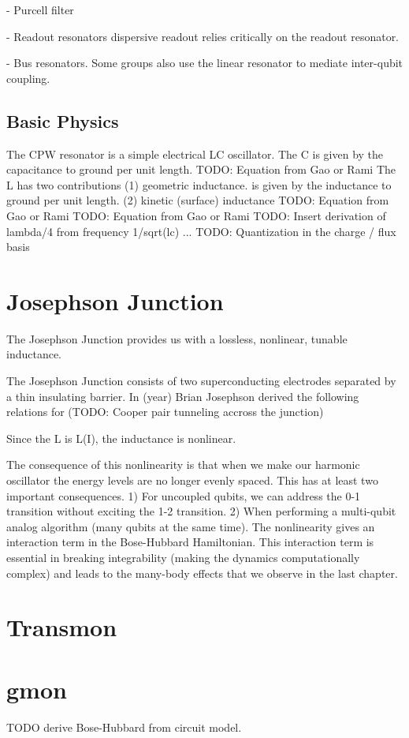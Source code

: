 - Purcell filter

- Readout resonators
dispersive readout relies critically on the readout resonator.

- Bus resonators.
Some groups also use the linear resonator to mediate inter-qubit coupling.

\subsection{Basic Physics}
The CPW resonator is a simple electrical LC oscillator.
The C is given by the capacitance to ground per unit length.
TODO:  Equation from Gao or Rami
The L has two contributions
(1) geometric inductance.  is given by the inductance to ground per unit length.
(2) kinetic (surface) inductance
TODO:  Equation from Gao or Rami
TODO:  Equation from Gao or Rami
TODO:  Insert derivation of lambda/4 from frequency 1/sqrt(lc) ...
TODO:  Quantization in the charge / flux basis

\section{Josephson Junction}
The Josephson Junction provides us with a lossless, nonlinear, tunable inductance.

The Josephson Junction consists of two superconducting electrodes separated by a thin insulating barrier.
In (year) Brian Josephson derived the following relations for (TODO: Cooper pair tunneling accross the junction)

Since the L is L(I), the inductance is nonlinear.

The consequence of this nonlinearity is that when we make our harmonic oscillator the energy levels are no longer evenly spaced.
This has at least two important consequences.
1) For uncoupled qubits, we can address the 0-1 transition without exciting the 1-2 transition.
2) When performing a multi-qubit analog algorithm (many qubits at the same time).
The nonlinearity gives an interaction term in the Bose-Hubbard Hamiltonian.
This interaction term is essential in breaking integrability (making the dynamics computationally complex) and leads to the many-body effects that we observe in the last chapter.

\section{Transmon}

\section{gmon}
TODO derive Bose-Hubbard from circuit model.

